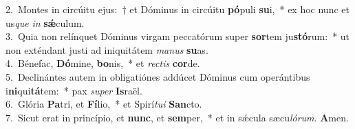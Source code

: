 {2.~}Montes in circúitu ejus:~† et Dóminus in circúitu \textbf{pó}puli \textbf{su}i,~* ex hoc nunc et us\textit{que} \textit{in} \textbf{sǽ}culum.\\
{3.~}Quia non relínquet Dóminus virgam peccatórum super \textbf{sor}tem ju\textbf{stó}rum:~* ut non exténdant justi ad iniquitátem \textit{ma}\textit{nus} \textbf{su}as.\\
{4.~}Bénefac, \textbf{Dó}mine, \textbf{bo}nis,~* et \textit{re}\textit{ctis} \textbf{cor}de.\\
{5.~}Declinántes autem in obligatiónes addúcet Dóminus cum operántibus i\textbf{ni}qui\textbf{tá}tem:~* pax \textit{su}\textit{per} \textbf{Is}raël.\\
{6.~}Glória \textbf{Pa}tri, et \textbf{Fí}lio,~* et Spirí\textit{tu}\textit{i} \textbf{San}cto.\\
{7.~}Sicut erat in princípio, et \textbf{nunc}, et \textbf{sem}per,~* et in sǽcula sæcu\textit{ló}\textit{rum}. \textbf{A}men.\\
